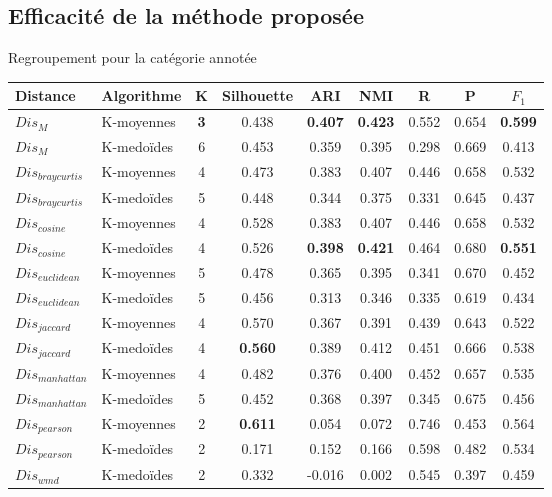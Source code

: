 \subsection{Efficacité de la méthode proposée}
\begin{frame}{\mysubsectiontitle}
	Regroupement pour la catégorie annotée
	\begin{table}[!htb]
		\centering \tiny
		\begin{tabular}[pos]{|l|l|c|c|c|c|c|c|c|}
			\hline
			{Distance}& {Algorithme}& {K}& {Silhouette}& {ARI} & {NMI} & {R} & {P} & ${F_1}$ \\ \hline
			$Dis_{M}$          & K-moyennes    & \textbf{3} & 0.438      & \textbf{0.407} & \textbf{0.423} & 0.552  & 0.654     & \textbf{0.599} \\ \hline
			$Dis_{M}$          & K-medoïdes  & 6 & 0.453      & 0.359 & 0.395 & 0.298  & 0.669     & 0.413 \\ \hline
			$Dis_{braycurtis}$ & K-moyennes    & 4 & 0.473      & 0.383 & 0.407 & 0.446  & 0.658     & 0.532 \\ \hline
			$Dis_{braycurtis}$ & K-medoïdes  & 5 & 0.448      & 0.344 & 0.375 & 0.331  & 0.645     & 0.437 \\ \hline
			$Dis_{cosine}$     & K-moyennes    & 4 & 0.528      & 0.383 & 0.407 & 0.446  & 0.658     & 0.532 \\ \hline
			$Dis_{cosine}$     & K-medoïdes  & 4 & 0.526      & \textbf{0.398} & \textbf{0.421} & 0.464  & 0.680     & \textbf{0.551} \\ \hline
			$Dis_{euclidean}$  & K-moyennes    & 5 & 0.478      & 0.365 & 0.395 & 0.341  & 0.670     & 0.452 \\ \hline
			$Dis_{euclidean}$  & K-medoïdes  & 5 & 0.456      & 0.313 & 0.346 & 0.335  & 0.619     & 0.434 \\ \hline
			$Dis_{jaccard}$    & K-moyennes    & 4 & 0.570      & 0.367 & 0.391 & 0.439  & 0.643     & 0.522 \\ \hline
			$Dis_{jaccard}$    & K-medoïdes  & 4 & \textbf{0.560}      & 0.389 & 0.412 & 0.451  & 0.666     & 0.538 \\ \hline
			$Dis_{manhattan}$  & K-moyennes    & 4 & 0.482      & 0.376 & 0.400 & 0.452  & 0.657     & 0.535 \\ \hline
			$Dis_{manhattan}$  & K-medoïdes  & 5 & 0.452      & 0.368 & 0.397 & 0.345  & 0.675     & 0.456 \\ \hline
			$Dis_{pearson}$    & K-moyennes    & 2 & \textbf{0.611}      & 0.054 & 0.072 & 0.746  & 0.453     & 0.564 \\ \hline
			$Dis_{pearson}$    & K-medoïdes  & 2 & 0.171      & 0.152 & 0.166 & 0.598  & 0.482     & 0.534 \\ \hline
			$Dis_{wmd}$      & K-medoïdes  & 2 & 0.332      & -0.016 & 0.002 & 0.545  & 0.397     & 0.459 \\ \hline
		\end{tabular}
	\end{table}
\end{frame}


